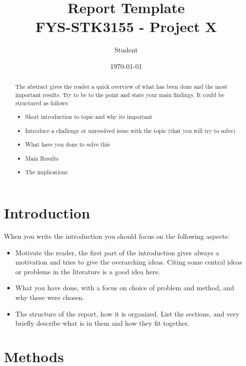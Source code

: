 \documentclass[amssymb,twocolumn,aps]{revtex4}
\begin{document}
	
\title{Report Template \\
    \normalsize FYS-STK3155 - Project X}
\date{\today}               
\author{Student}

\newpage
	
\begin{abstract}
The abstract gives the reader a quick overview of what has been done and the most important results. Try to be to the point and state your main findings. It could be structured as follows:
\begin{itemize}
    \item Short introduction to topic and why its important
    \item Introduce a challenge or unresolved issue with the topic (that you will try to solve)
    \item What have you done to solve this
    \item Main Results
    \item The implications
\end{itemize}
\end{abstract}

\maketitle

\section{Introduction}
When you write the introduction you should focus on the following aspects:
\begin{itemize}
    \item Motivate the reader, the first part of the introduction gives always a motivation and tries to give the overarching ideas. Citing some central ideas or problems in the literature is a good idea here. \cite{compfys}\cite{eigenvalue}\cite{hein, hastie}
    \item What you have done, with a focus on choice of problem and method, and why these were chosen.
    \item The structure of the report, how it is organized. List the sections, and very briefly describe what is in them and how they fit together.
\end{itemize}
    
\section{Methods}\label{section:methods}
\end{document}
